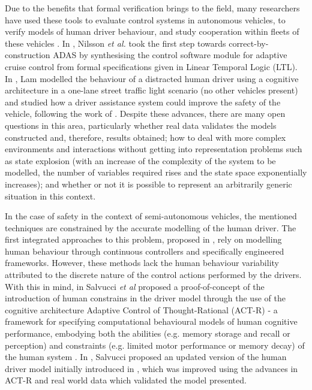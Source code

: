Due to the benefits that formal verification brings to the field, many researchers have used these tools to evaluate control systems in autonomous vehicles, to verify models of human driver behaviour, and study cooperation within fleets of these vehicles \cite{games, fv2, fv3, fv1}. In \cite{nilsson}, Nilsson \textit{et al.} took the first step towards correct-by-construction ADAS by synthesising the control software module for adaptive cruise control from formal specifications given in Linear Temporal Logic (LTL). In \cite{lam}, Lam modelled the behaviour of a distracted human driver using a cognitive architecture in a one-lane street traffic light scenario (no other vehicles present) and studied how a driver assistance system could improve the safety of the vehicle, following the work of \cite{salvucci_1, curzon}. Despite these advances, there are many open questions in this area, particularly whether real data validates the models constructed and, therefore, results obtained; how to deal with more complex environments and interactions without getting into representation problems such as state explosion (with an increase of the complexity of the system to be modelled, the number of variables required rises and the state space exponentially increases); and whether or not it is possible to represent an arbitrarily generic situation in this context.

In the case of safety in the context of semi-autonomous vehicles, the mentioned techniques are constrained by the accurate modelling of the human driver. The first integrated approaches to this problem, proposed in \cite{boer, older_1, older_3}, rely on modelling human behaviour through continuous controllers and specifically engineered frameworks. However, these methods lack the human behaviour variability attributed to the discrete nature of the control actions performed by the drivers. With this in mind, in \cite{salvucci_0} Salvucci \textit{et al} proposed a proof-of-concept of the introduction of human constrains in the driver model through the use of the cognitive architecture Adaptive Control of Thought-Rational (ACT-R) - a framework for specifying computational behavioural models of human cognitive performance, embodying both the abilities (e.g. memory storage and recall or perception) and constraints (e.g. limited motor performance or memory decay) of the human system \cite{salvucci_1}. In \cite{salvucci_1}, Salvucci proposed an updated version of the human driver model initially introduced in \cite{salvucci_0}, which was improved using the advances in ACT-R and real world data which validated the model presented.

